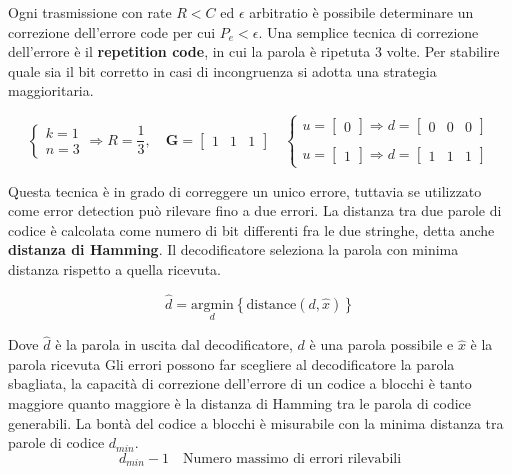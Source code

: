 Ogni trasmissione con rate $R < C$ ed $\epsilon$ arbitratio è possibile determinare un correzione dell'errore code per cui $P_e < \epsilon$.
Una semplice tecnica di correzione dell'errore è il \textbf{repetition code}, in cui la parola è ripetuta 3 volte. 
Per stabilire quale sia il bit corretto in casi di incongruenza si adotta una strategia maggioritaria.


\[
    \begin{cases}
        k = 1 \\
        n = 3 
    \end{cases}
    \Rightarrow R = \frac{1}{3},
    \quad \mathbf{G} =
    \begin{bmatrix}
        1 & 1 & 1
    \end{bmatrix}
    \quad 
    \begin{cases}
        u = \begin{bmatrix}0\end{bmatrix} \Rightarrow d = \begin{bmatrix}0 & 0 & 0\end{bmatrix} \\
        \\
        u = \begin{bmatrix}1\end{bmatrix} \Rightarrow d = \begin{bmatrix}1 & 1 & 1\end{bmatrix}
    \end{cases}
\]


Questa tecnica è in grado di correggere un unico errore, tuttavia se utilizzato come error detection può rilevare fino a due errori.
La distanza tra due parole di codice è calcolata come numero di bit differenti fra le due stringhe, detta anche \textbf{distanza di Hamming}. Il decodificatore seleziona la parola  con minima distanza rispetto a quella ricevuta.

\[
    \hat{d} = \underset{d}{\mathrm{argmin}} \left\{\text{distance}(d, \hat{x})\right\}
\]

Dove $\hat{d}$ è la parola in uscita dal decodificatore, $d$ è una parola possibile e $\hat{x}$ è la parola ricevuta
Gli errori possono far scegliere al decodificatore la parola sbagliata, la capacità di correzione dell'errore di un codice a blocchi è tanto maggiore quanto maggiore è la distanza di Hamming tra le parola  di codice generabili.
La bontà del codice a blocchi è misurabile con la minima distanza tra parole di codice $d_{min}$.
\[
    d_{min} - 1 \quad \text{Numero massimo di errori rilevabili}
\]

